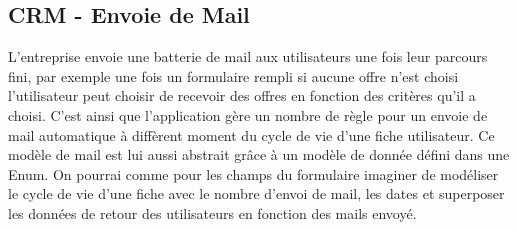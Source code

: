 \subsection{CRM - Envoie de Mail}
L'entreprise envoie une batterie de mail aux utilisateurs une fois leur parcours fini, par exemple une fois un formulaire rempli si aucune offre n'est choisi l'utilisateur peut choisir de recevoir des offres en fonction des critères qu'il a choisi. C'est ainsi que l'application gère un nombre de règle pour un envoie de mail automatique à diffèrent moment du cycle de vie d'une fiche utilisateur.
Ce modèle de mail est lui aussi abstrait grâce à un modèle de donnée défini dans une Enum. On pourrai comme pour les champs du formulaire imaginer de modéliser le cycle de vie d'une fiche avec le nombre d'envoi de mail, les dates et superposer les données de retour des utilisateurs en fonction des mails envoyé.